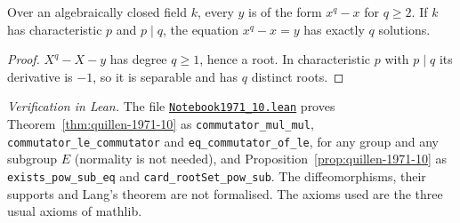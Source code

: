 \begin{encadre}
\begin{proposition}[Notebook 1971-10, p.~8]\label{prop:quillen-1971-10}
Over an algebraically closed field $k$, every $y$ is of the form $x^q - x$ for $q \ge 2$. If $k$ has characteristic $p$ and $p \mid q$, the equation $x^q - x = y$ has exactly $q$ solutions.
\end{proposition}
\end{encadre}

\begin{proof}
$X^q - X - y$ has degree $q \ge 1$, hence a root. In characteristic $p$ with $p \mid q$ its derivative is $-1$, so it is separable and has $q$ distinct roots.
\end{proof}

\emph{Verification in Lean.} The file \href{\leanblobmain/Notebook1971_10.lean}{\texttt{Notebook1971\_10.\allowbreak{}lean}} proves Theorem~\ref{thm:quillen-1971-10} as \texttt{commutator\_mul\_mul}, \texttt{commutator\_le\_commutator} and \texttt{eq\_commutator\_of\_le}, for any group and any subgroup $E$ (normality is not needed), and Proposition~\ref{prop:quillen-1971-10} as \texttt{exists\_pow\_sub\_eq} and \texttt{card\_rootSet\_pow\_sub}. The diffeomorphisms, their supports and Lang's theorem are not formalised. The axioms used are the three usual axioms of mathlib.

